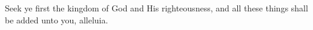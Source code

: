 
Seek ye first the kingdom of God \GreStar and His righteousness, and all these things shall be added unto you, alleluia.
